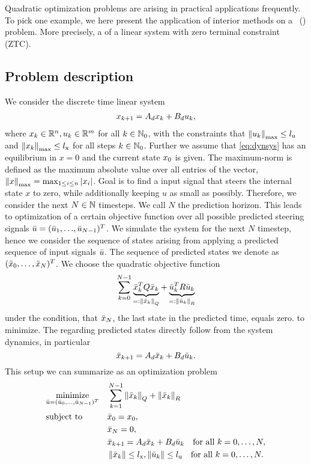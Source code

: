 Quadratic optimization problems are arising in practical applications frequently. To pick one example, we here present the application of interior methods on a \mpclong \ (\mpc) problem. More precisely, a \mpc of a linear system with zero terminal constraint (ZTC).

\subsection{Problem description \mpc}
We consider the discrete time linear system
\begin{align}
	x_{k+1} = A_d x_k + B_d u_k, \label{eq:dynsys}
\end{align}
where $ x_k \in \mathbb{R}^n, u_k \in \mathbb{R}^m $ for all $ k \in  \mathbb{N}_0$, with the constraints that $ {\left\lVert u_k\right\rVert}_{\mathrm{max}} \leq {l}_{\mathrm{u}}$
and $ {\left\lVert x_k\right\rVert}_{\mathrm{max}} \leq {l}_{\mathrm{x}} $ for all steps $ k\in \mathbb{N}_0 $. Further we assume that \eqref{eq:dynsys} has an equilibrium in $ x = 0 $ and the current state $ x_0 $ is given. The maximum-norm is defined as the maximum absolute value over all entries of the vector, ${\left\lVert x\right\rVert}_{\mathrm{max}} = \max_{1\leq i\leq n } |x_i| $.
Goal is to find a input signal that steers the internal state $ x $ to zero, while additionally keeping $ u $ as small as possibly. Therefore, we consider the next $ N \in \mathbb{N} $ timesteps. We call $ N $ the prediction horizon.
This leads to optimization of a certain objective function over all possible predicted steering signals $ \bar{u} = ({\bar{u}_1},{\dots},{\bar{u}_{N-1}})^T $. We simulate the system for the next $ N $ timestep, hence we consider the sequence of states arising from applying a predicted sequence of input signals $ \bar{u} $. The sequence of predicted states we denote as $ (\bar{x}_0,\dots,\bar{x}_N)^T $.
We choose the quadratic objective function
\begin{equation}
	\sum_{k = 0}^{N-1} \underbrace{\bar{x}_k^T Q \bar{x}_k }_{=: \left\lVert\bar{x}_k\right\rVert_Q}+ \underbrace{\bar{u}_k ^T R \bar{u}_k}_{=:\left\lVert\bar{u}_k\right\rVert_R} \label{eq:mpcobjraw}
\end{equation}
 under the condition, that $ \bar{x}_N $, the last state in the predicted time, equals zero. 
to minimize. The regarding predicted states directly follow from the system dynamics, in particular
\[ \bar{x}_{k+1} = A_d \bar{x}_k + B_d \bar{u}_k. \]
This setup we can summarize as an optimization problem
\begin{equation}
	\begin{aligned}
	& \underset{\bar{u}=(\bar{u}_0,\dots,\bar{u}_{N-1})^T}{\text{minimize}}
	& & \sum_{k = 1}^{N-1} \left\lVert\bar{x}_k\right\rVert_Q + \left\lVert\bar{x}_k\right\rVert_R\\
	& \text{subject to}
	& & \bar{x}_0 = x_0,\\
	& & &\bar{x}_N = 0,\\
	& & &\bar{x}_{k+1} = A_d \bar{x}_k + B_d \bar{u}_k \text{\quad for all } k = 0,\dots,N,\\
	& & &\left\lVert\bar{x}_k\right\rVert \leq {l}_{\mathrm{x}}, \left\lVert\bar{u}_k\right\rVert \leq {l}_{\mathrm{u}} \text{\quad for all } k = 0,\dots,N.
	\end{aligned}
\end{equation}


